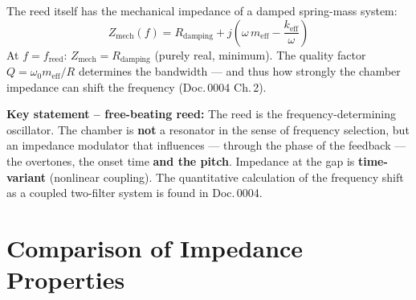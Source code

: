\documentclass[11pt,a4paper]{article}
\begin{document}
The reed itself has the mechanical impedance of a damped spring-mass system:
\begin{equation}
Z_\text{mech}(f) = R_\text{damping} + j\!\left(\omega\, m_\text{eff} - \frac{k_\text{eff}}{\omega}\right)
\end{equation}
At $f = f_\text{reed}$: $Z_\text{mech} = R_\text{damping}$ (purely real, minimum). The quality factor $Q = \omega_0 m_\text{eff}/R$ determines the bandwidth --- and thus how strongly the chamber impedance can shift the frequency (Doc.\,0004 Ch.\,2).

\begin{keybox}
\textbf{Key statement -- free-beating reed:} The reed is the frequency-determining oscillator. The chamber is \textbf{not} a resonator in the sense of frequency selection, but an impedance modulator that influences --- through the phase of the feedback --- the overtones, the onset time \textbf{and the pitch}. Impedance at the gap is \textbf{time-variant} (nonlinear coupling). The quantitative calculation of the frequency shift as a coupled two-filter system is found in Doc.\,0004.
\end{keybox}

\section{Comparison of Impedance Properties}
\end{document}

